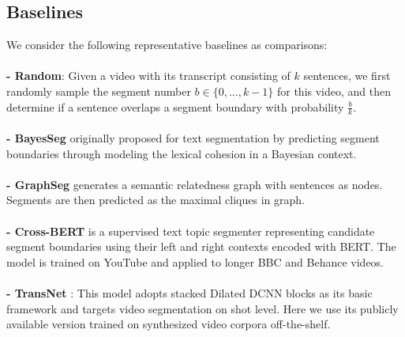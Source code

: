 \documentclass[runningheads]{llncs}
\begin{document}
\subsection{Baselines}
\vspace{-1ex}
We consider %
the following representative baselines as comparisons:\\
\vspace{-2ex} \\
\textbf{- Random}: Given a video with its transcript consisting of $k$ sentences, we first randomly sample the segment number $b \in \{0,...,k-1\}$ for this video, and then determine if a sentence overlaps a segment boundary with probability $\frac{b}{k}$. \\
\vspace{-2ex} \\
\textbf{- BayesSeg} \cite{eisenstein-barzilay-2008-bayesian} originally proposed for text segmentation by predicting segment boundaries through modeling the lexical cohesion in a Bayesian context. \\
\vspace{-2ex} \\
\textbf{- GraphSeg} \cite{glavas-etal-2016-unsupervised} generates a semantic relatedness graph with sentences as nodes. Segments are then predicted as the maximal cliques in graph.\\
\vspace{-2ex} \\
\textbf{- Cross-BERT} \cite{lukasik-etal-2020-text} is a supervised text topic segmenter representing candidate segment boundaries using their left and right contexts encoded with BERT. %
The model is trained on YouTube and applied to longer BBC and Behance videos.\\
\vspace{-2ex} \\
\textbf{- TransNet} \cite{soucek2020transnetv2}: This model adopts stacked Dilated DCNN blocks as its basic framework and targets %
video segmentation on shot level. Here we use its publicly available version trained on synthesized video corpora off-the-shelf.\\
\vspace{-2ex} \\
\end{document}
